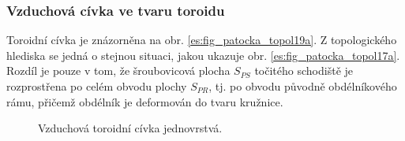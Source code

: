       \subsubsection{Vzduchová cívka ve tvaru toroidu}
        Toroidní cívka je znázorněna na obr. \ref{es:fig_patocka_topol19a}. Z topologického 
        hlediska se jedná o stejnou situaci, jakou ukazuje obr. \ref{es:fig_patocka_topol17a}. 
        Rozdíl je pouze v tom, že šroubovicová plocha \(S_{PS}\) točitého schodiště je rozprostřena 
        po celém obvodu plochy \(S_{PR}\), tj. po obvodu původně obdélníkového rámu, přičemž 
        obdélník je deformován do tvaru kružnice.

        \begin{figure}[ht!]
          \centering  
          \caption{Vzduchová toroidní cívka jednovrstvá. \cite[s.~58]{Patocka4}} 
          \label{es:fig_patocka_topol19}
        \end{figure}
        
